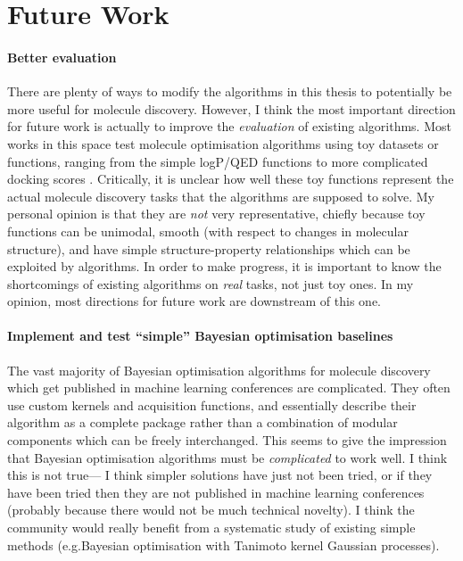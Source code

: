 \section{Future Work}
\label{sec:conclusion:future-work}

\paragraph{Better evaluation}
There are plenty of ways to modify the algorithms in this thesis
to potentially be more useful for molecule discovery.
However, I think the most important direction for future work is
actually to improve the \emph{evaluation} of existing algorithms.
Most works in this space test molecule optimisation algorithms
using toy datasets or functions, ranging from the simple logP/QED functions
to more complicated docking scores \citep{ortegon2021dockstring}.
Critically, it is unclear how well these toy functions
represent the actual molecule discovery tasks that the algorithms are supposed to solve.
My personal opinion is that they are \emph{not} very representative,
chiefly because toy functions can be unimodal, smooth (with respect to changes in molecular structure),
and have simple structure-property relationships which can be exploited by algorithms.
In order to make progress, it is important to know the shortcomings of existing algorithms
on \emph{real} tasks, not just toy ones.
In my opinion, most directions for future work are downstream of this one.

\paragraph{Implement and test ``simple'' Bayesian optimisation baselines}
The vast majority of Bayesian optimisation algorithms for molecule discovery
which get published in machine learning conferences are complicated. They often use
custom kernels and acquisition functions, and essentially describe their algorithm
as a complete package rather than a combination of modular components which can be
freely interchanged. This seems to give the impression that Bayesian optimisation
algorithms must be \emph{complicated} to work well.
I think this is not true--- I think simpler solutions have just not been tried,
or if they have been tried then they are not published in machine learning conferences
(probably because there would not be much technical novelty).
I think the community would really benefit from a systematic study of existing
simple methods (e.g.\@ Bayesian optimisation with Tanimoto kernel Gaussian processes).

